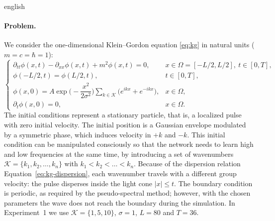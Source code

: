 \documentclass[12pt,letterpaper,twoside]{book}
\newcommand{\abs}[1]{\left\lvert #1 \right\rvert}
\newif\ifreviewmode
\newcommand{\revtag}[2]{\ifreviewmode{\color{red!70!black}\textsf{\footnotesize[#1#2]}}\fi}
\newcommand{\verificar}[1]{\revtag{VERIFICAR}{: #1}}
\begin{document}
\begin{hyphenrules}{english}
\paragraph{Problem.}
We consider the one-dimensional Klein--Gordon equation \eqref{eq:kg} in natural units ($m=c=\hbar=1$):
\begin{equation}
  \begin{cases}
    \partial_{tt}\phi(x,t)-\partial_{xx}\phi(x,t)+m^2\phi(x,t)=0, & x\in\Omega=[-L/2,L/2],\ t\in[0,T],\\
    \phi(-L/2,t)=\phi(L/2,t), & t\in[0,T],\\
    \phi(x,0)=A\exp\Big(-\dfrac{x^2}{2\sigma^2}\Big)\displaystyle\sum_{k\in\mathcal{K}}\big(e^{ikx}+e^{-ikx}\big), & x\in\Omega,\\
    \partial_t\phi(x,0)=0, & x\in\Omega.
  \end{cases}
  \label{eq:kg-problem}
\end{equation}
The initial conditions represent a stationary particle, that is, a localized pulse with zero initial
velocity. The initial position is a Gaussian envelope modulated by a symmetric phase, which induces
velocity in $+k$ and $-k$. This initial condition can be manipulated consciously so that the network
needs to learn high and low frequencies at the same time, by introducing a set of wavenumbers
$\mathcal{K}=\{k_1,k_2,\dots,k_n\}$ with $k_1<k_2<\dots<k_n$. Because of the dispersion relation
Equation~\eqref{eq:kg-dispersion}, each wavenumber travels with a different group velocity: the pulse disperses
inside the light cone $\abs{x}\le t$. The boundary condition is periodic, as required by the
pseudo-spectral method; however, with the chosen parameters the wave does not reach the boundary during
the simulation. In Experiment~1 we use $\mathcal{K}=\{1,5,10\}$, $\sigma=1$, $L=80$ and $T=36$.
\verificar{value of the amplitude $A$; the presentation writes $\Omega=[-L,L]$ but the figures show
$x\in[-40,40]$}


\end{hyphenrules}
\end{document}
